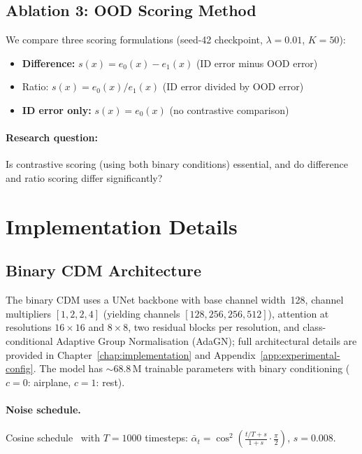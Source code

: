 \subsection{Ablation 3: OOD Scoring Method}
\label{sec:exp:design:scoring}

We compare three scoring formulations (seed-42 checkpoint,
$\lambda = 0.01$, $K = 50$):
\begin{itemize}
  \item \textbf{Difference:} $s(x) = e_0(x) - e_1(x)$ (ID error minus OOD error)
  \item Ratio: $s(x) = e_0(x) / e_1(x)$ (ID error divided by OOD error)
  \item \textbf{ID error only:} $s(x) = e_0(x)$ (no contrastive comparison)
\end{itemize}

\paragraph{Research question:}
Is contrastive scoring (using both binary conditions) essential, and do
difference and ratio scoring differ significantly?


\section{Implementation Details}
\label{sec:exp:implementation-details}

\subsection{Binary CDM Architecture}
\label{sec:exp:impl:binary-cdm}

The binary CDM uses a UNet backbone with base channel width~128, channel
multipliers $[1, 2, 2, 4]$ (yielding channels $[128, 256, 256, 512]$),
attention at resolutions $16 \times 16$ and $8 \times 8$, two residual
blocks per resolution, and class-conditional Adaptive Group
Normalisation (AdaGN); full architectural details are provided in
Chapter~\ref{chap:implementation}
and Appendix~\ref{app:experimental-config}.
The model has ${\sim}68.8$\,M trainable parameters with binary
conditioning ($c = 0$: airplane, $c = 1$: rest).

\paragraph{Noise schedule.}
Cosine schedule~\cite{nichol2021improved} with $T = 1000$ timesteps:
$\bar{\alpha}_t
  = \cos^2\!\left(\frac{t/T + s}{1 + s} \cdot \frac{\pi}{2}\right)$,
$s = 0.008$.

